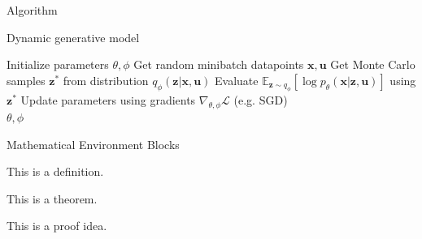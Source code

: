 \documentclass [aspectratio=169]{beamer}
\begin{document}
\begin{frame}{Algorithm}

    \begin{algorithm}[H]
        \caption{Dynamic generative model}
        \begin{algorithmic}
        \State Initialize parameters $\theta, \phi$ 
        \Repeat
        \State Get random minibatch datapoints $\mathbf{x}, \mathbf{u}$
        \State Get Monte Carlo samples $\mathbf{z}^* $ from distribution $q_{\phi}(\mathbf{z}|\mathbf{x}, \mathbf{u})$
        \State Evaluate $\mathbb{E}_{\mathbf{z} \sim q_{\phi}} [\log p_{\theta}(\mathbf{x}|\mathbf{z}, \mathbf{u})]$ using $\mathbf{z}^* $
        \State Update parameters using gradients $\nabla_{\theta,\phi}\mathcal{L}$ (e.g. SGD)
        \\ \Return $\theta, \phi$
        \end{algorithmic}
        \label{algorithm}
    \end{algorithm}
	
\end{frame}

\begin{frame}{Mathematical Environment Blocks}
    \begin{definition} 
        This is a definition.
    \end{definition}
    
    \begin{theorem} 
        This is a theorem. 
    \end{theorem}
    
    \begin{lemma} 
        This is a proof idea.
    \end{lemma}
\end{frame}
\end{document}
